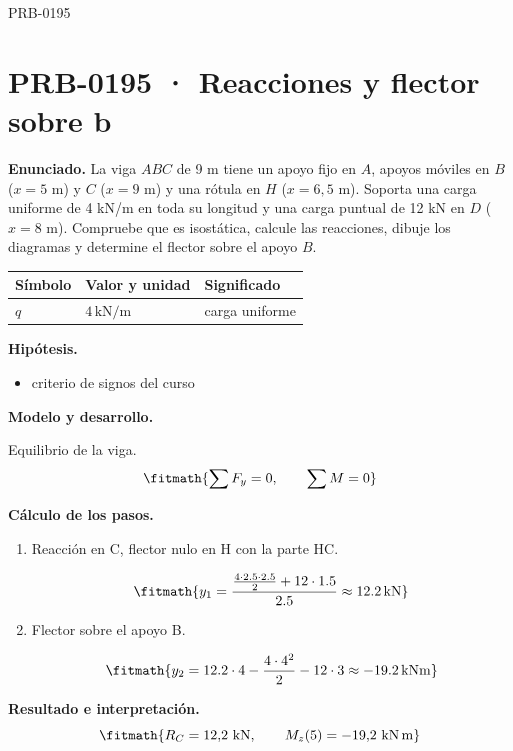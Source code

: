 \begin{studiumworked}{PRB-0195}

\section{PRB-0195 · Reacciones y flector sobre b}

\textbf{Enunciado.} La viga $A B C$ de 9 m tiene un apoyo fijo en $A$, apoyos móviles en $B$ ($x = 5$ m) y $C$ ($x = 9$ m) y una rótula en $H$ ($x = 6{,}5$ m). Soporta una carga uniforme de 4 kN/m en toda su longitud y una carga puntual de 12 kN en $D$ ($x = 8$ m). Compruebe que es isostática, calcule las reacciones, dibuje los diagramas y determine el flector sobre el apoyo $B$.

\par\medskip\noindent\begin{tabular}{@{}p{.18\linewidth}p{.26\linewidth}p{.48\linewidth}@{}}
\toprule Símbolo & Valor y unidad & Significado\\\midrule
$q$ & $4\,\mathrm{kN/m}$ & carga uniforme\\
\bottomrule\end{tabular}\par\medskip

\textbf{Hipótesis.}\begin{itemize}\item criterio de signos del curso\end{itemize}

\textbf{Modelo y desarrollo.}

Equilibrio de la viga.\[\fitmath{\sum F_y = 0,\qquad \sum M = 0}\]

\textbf{Cálculo de los pasos.}

\begin{enumerate}

\item Reacción en C, flector nulo en H con la parte HC.

\[\fitmath{y_{1}=\frac{\frac{4\cdot 2.5\cdot 2.5}{2}+12\cdot 1.5}{2.5}\approx 12.2\,\mathrm{kN}}\]

\item Flector sobre el apoyo B.

\[\fitmath{y_{2}=12.2\cdot 4-\frac{4\cdot {4}^{2}}{2}-12\cdot 3\approx -19.2\,\mathrm{kN m}}\]

\end{enumerate}

\textbf{Resultado e interpretación.}\[\fitmath{R_C = 12{,}2\ \mathrm{kN},\qquad M_z(5) = -19{,}2\ \mathrm{kN\,m}}\]


\end{studiumworked}
